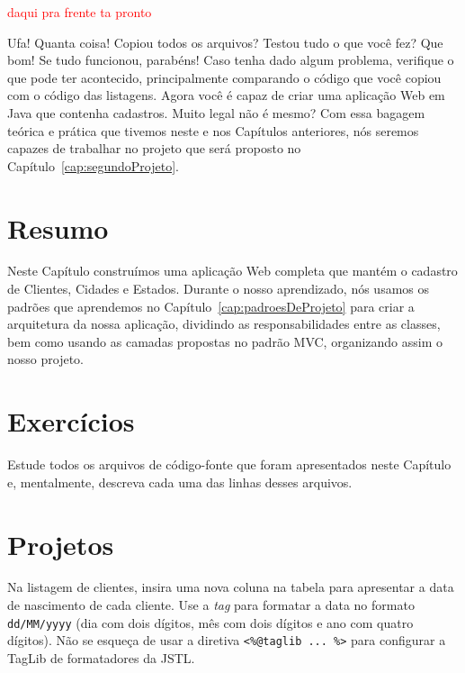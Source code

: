 \textcolor{red}{daqui pra frente ta pronto}

Ufa! Quanta coisa! Copiou todos os arquivos? Testou tudo o que você fez? Que bom! Se tudo funcionou, parabéns! Caso tenha dado algum problema, verifique o que pode ter acontecido, principalmente comparando o código que você copiou com o código das listagens. Agora você é capaz de criar uma aplicação Web em Java que contenha cadastros. Muito legal não é mesmo? Com essa bagagem teórica e prática que tivemos neste e nos Capítulos anteriores, nós seremos capazes de trabalhar no projeto que será proposto no Capítulo~\ref{cap:segundoProjeto}.

\section{Resumo}

Neste Capítulo construímos uma aplicação Web completa que mantém o cadastro de Clientes, Cidades e Estados. Durante o nosso aprendizado, nós usamos os padrões que aprendemos no Capítulo~\ref{cap:padroesDeProjeto} para criar a arquitetura da nossa aplicação, dividindo as responsabilidades entre as classes, bem como usando as camadas propostas no padrão MVC, organizando assim o nosso projeto. 


\section{Exercícios}

\begin{exercicioSemArquivo}{}{}{}
    Estude todos os arquivos de código-fonte que foram apresentados neste Capítulo e, mentalmente, descreva cada uma das linhas desses arquivos.
\end{exercicioSemArquivo}


\section{Projetos}

\begin{projetoSemArquivo}{}{}{}
    Na listagem de clientes, insira uma nova coluna na tabela para apresentar a data de nascimento de cada cliente. Use a \textit{tag}  para formatar a data no formato \texttt{dd/MM/yyyy} (dia com dois dígitos, mês com dois dígitos e ano com quatro dígitos). Não se esqueça de usar a diretiva \texttt{<\%@taglib ... \%>} para configurar a TagLib de formatadores da JSTL. 
\end{projetoSemArquivo}

